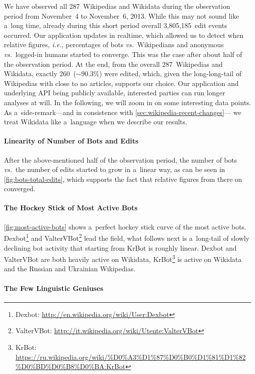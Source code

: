 \documentclass{sig-alternate}
\newcommand{\inlinelistingsize}{\fontsize{8pt}{11pt}}
\let\oldurl\url
\renewcommand{\url}[1]{\inlinelistingsize\oldurl{#1}}
\begin{document}
We have observed all 287~Wikipedias and Wikidata
during the observation period from November~4
to November~6, 2013.
While this may not sound like a~long time,
already during this short period
overall 3,805,185~edit events occurred.
Our application updates in realtime,
which allowed us to detect when relative figures,
\emph{i.e.}, percentages of bots \emph{vs.}\ Wikipedians
and anonymous \emph{vs.}\ logged-in humans started to converge.
This was the case after about half of the observation period.
At the end, from the overall 287~Wikipedias and Wikidata,
exactly 260~($\sim90.3\%$) were edited,
which, given the long-long-tail of Wikipedias
with close to no articles, supports our choice.
Our application and underlying API being publicly available,
interested parties can run longer analyses at will.
In the following, we will zoom in on some interesting data points.
As a~side-remark---and in consistence with
\autoref{sec:wikipedia-recent-changes}---%
we treat Wikidata like a~language when we describe our results. 

\paragraph{Linearity of Number of Bots and Edits}

After the above-mentioned half of the observation period,
the number of bots \emph{vs.}\ the number of edits
started to grow in a~linear way, as can be seen in \autoref{fig:bots-total-edits}, which supports the fact that
relative figures from there on converged.

\paragraph{The Hockey Stick of Most Active Bots}

\autoref{fig:most-active-bots} shows a~perfect hockey stick
curve of the most active bots.
Dexbot\footnote{Dexbot: \url{http://en.wikipedia.org/wiki/User:Dexbot}}
and ValterVBot\footnote{ValterVBot: \url{http://it.wikipedia.org/wiki/Utente:ValterVBot}} lead the field,
what follows next is a~long-tail of slowly declining bot activity
that starting from KrBot is roughly linear.
Dexbot and ValterVBot are both heavily active on Wikidata,
KrBot\footnote{KrBot: \url{https://ru.wikipedia.org/wiki/\%D0\%A3\%D1\%87\%D0\%B0\%D1\%81\%D1\%82\%D0\%BD\%D0\%B8\%D0\%BA:KrBot}}
is active on Wikidata and the Russian and Ukrainian Wikipedias.

\paragraph{The Few Linguistic Geniuses}
\end{document}
